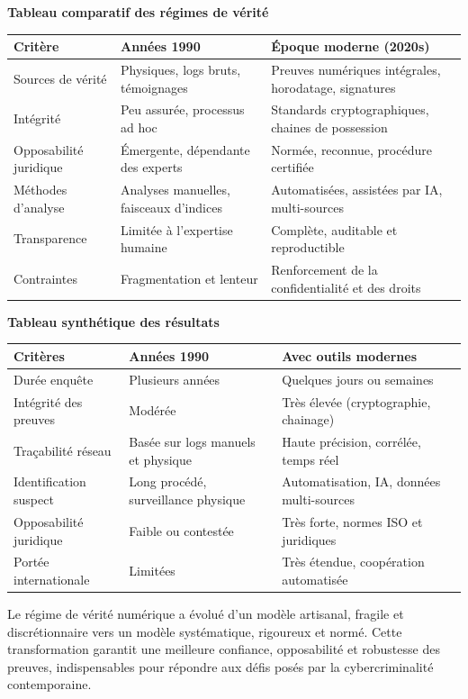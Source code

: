\documentclass[12pt, a4paper]{article}
\begin{document}
\begin{enumerate}[label=\textbf{\arabic*.}, start=6]
		\textbf{Tableau comparatif des régimes de vérité}
		
		\begin{tabular}{|p{4cm}|p{6cm}|p{6cm}|}
			\hline
			\textbf{Critère} & \textbf{Années 1990} & \textbf{Époque moderne (2020s)} \\
			\hline
			Sources de vérité & Physiques, logs bruts, témoignages & Preuves numériques intégrales, horodatage, signatures \\
			\hline
			Intégrité & Peu assurée, processus ad hoc & Standards cryptographiques, chaines de possession \\
			\hline
			Opposabilité juridique & Émergente, dépendante des experts & Normée, reconnue, procédure certifiée \\
			\hline
			Méthodes d'analyse & Analyses manuelles, faisceaux d'indices & Automatisées, assistées par IA, multi-sources \\
			\hline
			Transparence & Limitée à l'expertise humaine & Complète, auditable et reproductible \\
			\hline
			Contraintes & Fragmentation et lenteur & Renforcement de la confidentialité et des droits \\
			\hline
		\end{tabular}
		
		\textbf{Tableau synthétique des résultats}
		
		\begin{tabular}{|p{4cm}|p{6cm}|p{6cm}|}
			\hline
			\textbf{Critères} & \textbf{Années 1990} & \textbf{Avec outils modernes} \\
			\hline
			Durée enquête & Plusieurs années & Quelques jours ou semaines \\
			\hline
			Intégrité des preuves & Modérée & Très élevée (cryptographie, chainage) \\
			\hline
			Traçabilité réseau & Basée sur logs manuels et physique & Haute précision, corrélée, temps réel \\
			\hline
			Identification suspect & Long procédé, surveillance physique & Automatisation, IA, données multi-sources \\
			\hline
			Opposabilité juridique & Faible ou contestée & Très forte, normes ISO et juridiques \\
			\hline
			Portée internationale & Limitées & Très étendue, coopération automatisée \\
			\hline
		\end{tabular}
		
		Le régime de vérité numérique a évolué d'un modèle artisanal, fragile et discrétionnaire vers un modèle systématique, rigoureux et normé. Cette transformation garantit une meilleure confiance, opposabilité et robustesse des preuves, indispensables pour répondre aux défis posés par la cybercriminalité contemporaine.
		

\end{enumerate}
\end{document}
